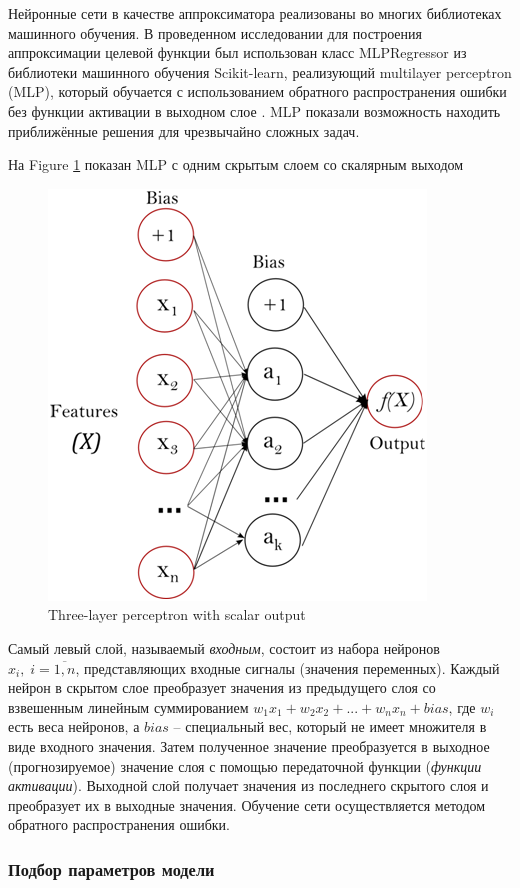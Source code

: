 \documentclass[sensors,article,submit,moreauthors,pdftex]{Definitions/mdpi}
\begin{document}
Нейронные сети в качестве аппроксиматора реализованы во многих библиотеках машинного обучения. 
В проведенном исследовании для построения аппроксимации целевой функции был использован класс MLPRegressor из библиотеки машинного обучения Scikit-learn, реализующий multilayer perceptron (MLP), который обучается с использованием обратного распространения ошибки без функции активации в выходном слое \cite{Nielsen1989}. MLP показали возможность находить приближённые решения для чрезвычайно сложных задач.

На Figure \ref{fig1} показан MLP с одним скрытым слоем со скалярным выходом

\begin{figure}[H]
\begin{center}
\includegraphics[width=0.5\linewidth]{perceptron.png}
\caption{Three-layer perceptron with scalar output}
\label{fig1}
\end{center}
\end{figure}   

Самый левый слой, называемый \textit{входным}, состоит из набора нейронов $x_i, \; i=\overline{1,n}$, представляющих входные сигналы (значения переменных). Каждый нейрон в скрытом слое преобразует значения из предыдущего слоя со взвешенным линейным суммированием $w_1 x_1 + w_2 x_2+...+w_n x_n+bias$, где $w_i$ есть веса нейронов, а $bias$ -- специальный вес, который не имеет множителя в виде входного значения. Затем полученное значение преобразуется в выходное (прогнозируемое) значение слоя с помощью передаточной функции (\textit{функции активации}). Выходной слой получает значения из последнего скрытого слоя и преобразует их в выходные значения. Обучение сети осуществляется методом обратного распространения ошибки.

\subsubsection{Подбор параметров модели}
\end{document}
